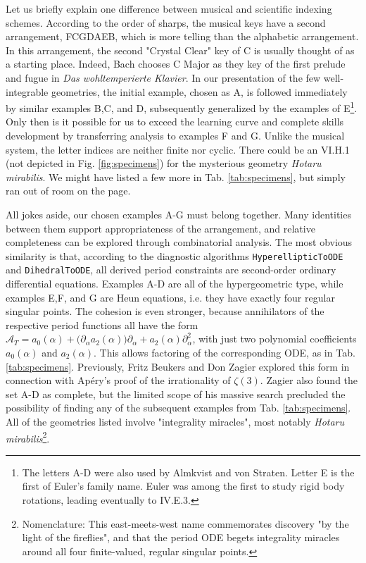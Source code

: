 \documentclass[nofootinbib,preprint]{revtex4-1}
\begin{document}
Let us briefly explain one difference between musical and scientific indexing schemes. 
According to the order of sharps, the musical keys have a second arrangement, FCGDAEB, which 
is more telling than the alphabetic arrangement. In this arrangement, the second "Crystal Clear" 
key of C is usually thought of as a starting place. Indeed, Bach chooses C Major as they key of 
the first prelude and fugue in \textit{Das wohltemperierte Klavier}. In our presentation of the 
few well-integrable geometries, the initial example, chosen as A, is followed immediately 
by similar examples B,C, and D, subsequently generalized by the examples of E\footnote{The 
letters A-D were also used by Almkvist and von Straten.  Letter E is the first of Euler's family 
name. Euler was among the first to study rigid body rotations, leading eventually to IV.E.3.}. 
Only then is it possible for us to exceed the learning curve and complete skills development 
by transferring analysis to examples F and G. Unlike the musical system, the letter
indices are neither finite nor cyclic. There could be an VI.H.1 (not depicted in Fig. \ref{fig:specimens}) 
for the mysterious geometry \textit{Hotaru mirabilis}. We might have listed a few more 
in Tab. \ref{tab:specimens}, but simply ran out of room on the page.
  
All jokes aside, our chosen examples A-G must belong together. Many identities between them 
support appropriateness of the arrangement, and relative completeness can be explored through 
combinatorial analysis. The most obvious similarity is that, according to the diagnostic
algorithms \texttt{HyperellipticToODE} and \texttt{DihedralToODE},  all derived period
constraints are second-order ordinary differential equations. Examples A-D are all of 
the hypergeometric type, while examples E,F, and G are Heun equations, i.e. they have
exactly four regular singular points. The cohesion is even stronger, because
annihilators of the respective period functions all have the form 
$\mathcal{A}_T=a_0(\alpha)+\big(\partial_{\alpha}a_2(\alpha)\big)\partial_{\alpha}+a_2(\alpha)\partial_{\alpha}^2$,
with just two polynomial coefficients $a_0(\alpha)$ and $a_2(\alpha)$. This allows factoring
of the corresponding ODE, as in Tab. \ref{tab:specimens}. Previously, Fritz Beukers and Don
Zagier explored this form in connection with Ap\'{e}ry's proof of the irrationality of $\zeta(3)$. 
Zagier also found the set A-D as complete, but the limited scope of his massive search precluded 
the possibility of finding any of the subsequent examples from Tab. \ref{tab:specimens}. 
All of the geometries listed involve "integrality miracles", most notably 
\textit{Hotaru mirabilis}\footnote{Nomenclature: This east-meets-west name commemorates 
discovery "by the light of the fireflies", and that the period ODE begets integrality 
miracles around all four finite-valued, regular singular points.}.  
\end{document}
